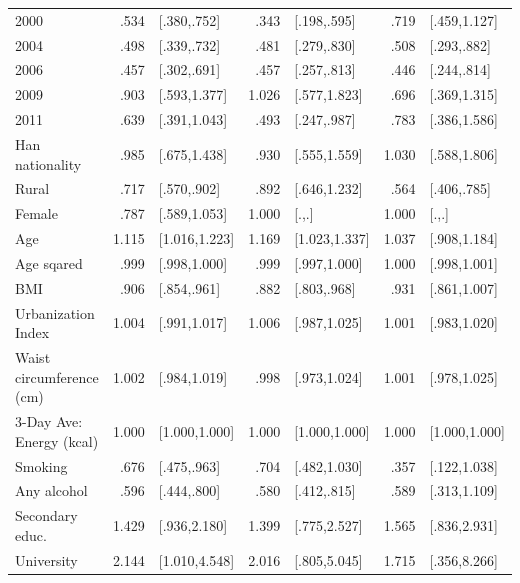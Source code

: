 \begin{table}[h]
\begin{adjustbox}{max width=\textwidth, center}
\begin{threeparttable}
{\begin{tabular}{l*{3}{D{.}{.}{-1}l}}
\hspace*{10mm}2000&     .534&     [.380,.752]&     .343&     [.198,.595]&     .719&    [.459,1.127]\\
\hspace*{10mm}2004&     .498&     [.339,.732]&     .481&     [.279,.830]&     .508&     [.293,.882]\\
\hspace*{10mm}2006&     .457&     [.302,.691]&     .457&     [.257,.813]&     .446&     [.244,.814]\\
\hspace*{10mm}2009&     .903&    [.593,1.377]&    1.026&    [.577,1.823]&     .696&    [.369,1.315]\\
\hspace*{10mm}2011&     .639&    [.391,1.043]&     .493&     [.247,.987]&     .783&    [.386,1.586]\\
Han nationality&     .985&    [.675,1.438]&     .930&    [.555,1.559]&    1.030&    [.588,1.806]\\
Rural           &     .717&     [.570,.902]&     .892&    [.646,1.232]&     .564&     [.406,.785]\\
Female          &     .787&    [.589,1.053]&    1.000&           [.,.]&    1.000&           [.,.]\\
Age&    1.115&   [1.016,1.223]&    1.169&   [1.023,1.337]&    1.037&    [.908,1.184]\\
Age sqared          &     .999&    [.998,1.000]&     .999&    [.997,1.000]&    1.000&    [.998,1.001]\\
\ac{BMI}             &     .906&     [.854,.961]&     .882&     [.803,.968]&     .931&    [.861,1.007]\\
Urbanization Index&    1.004&    [.991,1.017]&    1.006&    [.987,1.025]&    1.001&    [.983,1.020]\\
Waist circumference (cm)&    1.002&    [.984,1.019]&     .998&    [.973,1.024]&    1.001&    [.978,1.025]\\
3-Day Ave: Energy (kcal)&    1.000&   [1.000,1.000]&    1.000&   [1.000,1.000]&    1.000&   [1.000,1.000]\\
Smoking&     .676&     [.475,.963]&     .704&    [.482,1.030]&     .357&    [.122,1.038]\\
Any alcohol&     .596&     [.444,.800]&     .580&     [.412,.815]&     .589&    [.313,1.109]\\
Secondary educ.       &    1.429&    [.936,2.180]&    1.399&    [.775,2.527]&    1.565&    [.836,2.931]\\
University      &    2.144&   [1.010,4.548]&    2.016&    [.805,5.045]&    1.715&    [.356,8.266]\\

\end{tabular}}
\end{threeparttable}
\end{adjustbox}
\end{table}
